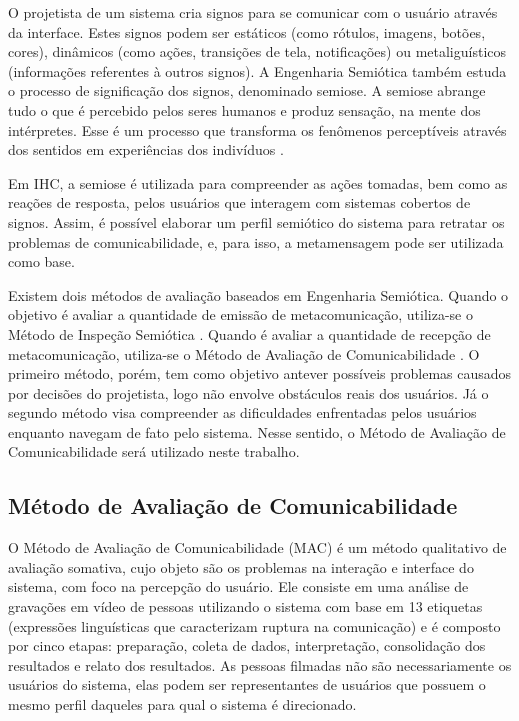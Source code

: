 \indent O projetista de um sistema cria signos para se comunicar com o usuário através da interface. Estes signos podem ser estáticos (como rótulos, imagens, botões, cores), dinâmicos (como ações, transições de tela, notificações) ou metaliguísticos (informações referentes à outros signos). A Engenharia Semiótica também estuda o processo de significação dos signos, denominado semiose. A semiose abrange tudo o que é percebido pelos seres humanos e produz sensação, na mente dos intérpretes. Esse é um processo que transforma os fenômenos perceptíveis através dos sentidos em experiências dos indivíduos \cite{semiose01}. 

\indent Em IHC, a semiose é utilizada para compreender as ações tomadas, bem como as reações de resposta, pelos usuários que interagem com sistemas cobertos de signos. Assim, é possível elaborar um perfil semiótico do sistema para retratar os problemas de comunicabilidade, e, para isso, a metamensagem pode ser utilizada como base.

\indent Existem dois métodos de avaliação baseados em Engenharia Semiótica. Quando o objetivo é avaliar a quantidade de emissão de metacomunicação, utiliza-se o Método de Inspeção Semiótica \cite{IHCbook}. Quando é avaliar a quantidade de recepção de metacomunicação, utiliza-se o Método de Avaliação de Comunicabilidade \cite{IHCbook}. O primeiro método, porém, tem como objetivo antever possíveis problemas causados por decisões do projetista, logo não envolve obstáculos reais dos usuários. Já o segundo método visa compreender as dificuldades enfrentadas pelos usuários enquanto navegam de fato pelo sistema. Nesse sentido, o Método de Avaliação de Comunicabilidade será utilizado neste trabalho.


\subsection{Método de Avaliação de Comunicabilidade} \label{MAC}

\indent O Método de Avaliação de Comunicabilidade (MAC) é um método qualitativo de avaliação somativa, cujo objeto são os problemas na interação e interface do sistema, com foco na percepção do usuário. Ele consiste em uma análise de gravações em vídeo de pessoas utilizando o sistema com base em 13 etiquetas (expressões linguísticas que caracterizam ruptura na comunicação) e é composto por cinco etapas\cite{IHCbook}: preparação, coleta de dados, interpretação, consolidação dos resultados e relato dos resultados. As pessoas filmadas não são necessariamente os usuários do sistema, elas podem ser representantes de usuários que possuem o mesmo perfil daqueles para qual o sistema é direcionado. 

